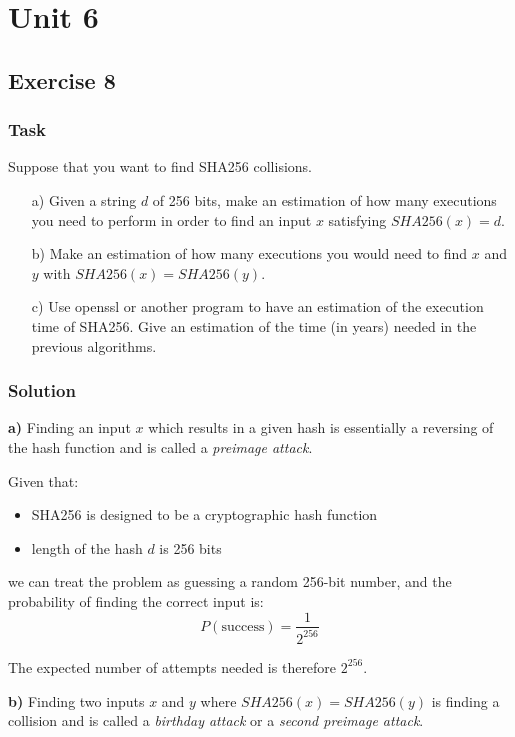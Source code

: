 \chapter{Unit 6}
\section{Exercise 8}

\subsection{Task}
Suppose that you want to find SHA256 collisions.
\begin{enumerate}
    \item[a)] Given a string \(d\) of 256 bits, make an estimation of how many executions you need to perform in order to find an input \(x\) satisfying \(SHA256(x) = d\).
    \item[b)] Make an estimation of how many executions you would need to find \(x\) and \(y\) with \(SHA256(x) = SHA256(y)\).
    \item[c)] Use openssl or another program to have an estimation of the execution time of SHA256. Give an estimation of the time (in years) needed in the previous algorithms.
\end{enumerate}

\subsection{Solution}

\textbf{a)} Finding an input $x$ which results in a given hash is essentially a reversing of the hash function and is called a \textit{preimage attack}.

Given that:
\begin{itemize}
    \item SHA256 is designed to be a cryptographic hash function
    \item length of the hash $d$ is 256 bits
\end{itemize}

we can treat the problem as guessing a random 256-bit number, and the probability of finding the correct input is:
\[ P(\text{success}) = \frac{1}{2^{256}} \]

The expected number of attempts needed is therefore $2^{256}$.

\textbf{b)} Finding two inputs \(x\) and \(y\) where \(SHA256(x) = SHA256(y)\) is finding a collision and is called a \textit{birthday attack} or a \textit{second preimage attack}.

